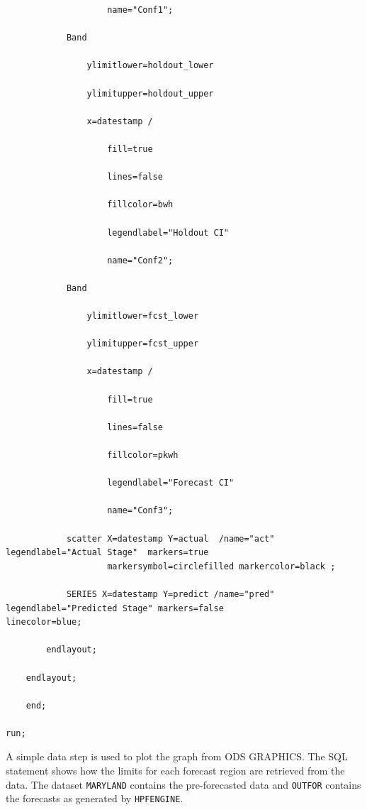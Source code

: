 \documentclass[10pt]{sugconf-ish}
\begin{document}
\begin{verbatim}
                    name="Conf1";

            Band

                ylimitlower=holdout_lower

                ylimitupper=holdout_upper

                x=datestamp / 

                    fill=true 

                    lines=false 

                    fillcolor=bwh

                    legendlabel="Holdout CI" 

                    name="Conf2";

            Band

                ylimitlower=fcst_lower

                ylimitupper=fcst_upper

                x=datestamp / 

                    fill=true 

                    lines=false 

                    fillcolor=pkwh

                    legendlabel="Forecast CI" 

                    name="Conf3";

            scatter X=datestamp Y=actual  /name="act"  legendlabel="Actual Stage"  markers=true 
            		markersymbol=circlefilled markercolor=black ;

            SERIES X=datestamp Y=predict /name="pred" legendlabel="Predicted Stage" markers=false 					linecolor=blue;

        endlayout;

    endlayout;

    end;

run;
\end{verbatim}
\normalsize
A simple data step is used to plot the graph from ODS GRAPHICS.  The SQL statement shows how the limits for each forecast region are retrieved from the data.  The dataset \texttt{MARYLAND} contains the pre-forecasted data and \texttt{OUTFOR} contains the forecasts as generated by \texttt{HPFENGINE}.
\scriptsize
\end{document}
